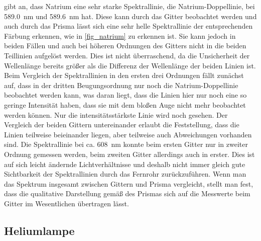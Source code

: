 \documentclass[
	a4paper,
	12pt,
	pagesize,
	ngerman
]{scrartcl}
\begin{document}
	\cite{NatriumDoppel} gibt an, dass Natrium eine sehr starke Spektrallinie, die Natrium-Doppellinie, bei \SI{589,0}{\nano \meter} und \SI{589,6}{\nano \meter} hat.
	Diese kann durch das Gitter beobachtet werden und auch durch das Prisma lässt sich eine sehr helle Spektrallinie der entsprechenden Färbung erkennen, wie in \cref{fig_natrium} zu erkennen ist.
	Sie kann jedoch in beiden Fällen und auch bei höheren Ordnungen des Gitters nicht in die beiden Teillinien aufgelöst werden.
	Dies ist nicht überraschend, da die Unsicherheit der Wellenlänge bereits größer als die Differenz der Wellenlänge der beiden Linien ist.
	Beim Vergleich der Spektrallinien in den ersten drei Ordnungen fällt zunächst auf, dass in der dritten Beugungsordnung nur noch die Natrium-Doppellinie beobachtet werden kann, was daran liegt, dass die Linien hier nur noch eine so geringe Intensität haben, dass sie mit dem bloßen Auge nicht mehr beobachtet werden können.
	Nur die intensitätsstärkste Linie wird noch gesehen.
	Der Vergleich der beiden Gittern untereinander erlaubt die Feststellung, dass die Linien teilweise beieinander liegen, aber teilweise auch Abweichungen vorhanden sind.
	Die Spektrallinie bei ca. \SI{608}{\nano \meter} konnte beim ersten Gitter nur in zweiter Ordnung gemessen werden, beim zweiten Gitter allerdings auch in erster.
	Dies ist auf sich leicht ändernde Lichtverhältnisse und deshalb nicht immer gleich gute Sichtbarkeit der Spektrallinien durch das Fernrohr zurückzuführen.
	Wenn man das Spektrum insgesamt zwischen Gittern und Prisma vergleicht, stellt man fest, dass die qualitative Darstellung gemäß des Prismas sich auf die Messwerte beim Gitter im Wesentlichen übertragen lässt.
	
	
	\subsection{Heliumlampe} \label{ss_helium}
\end{document}
